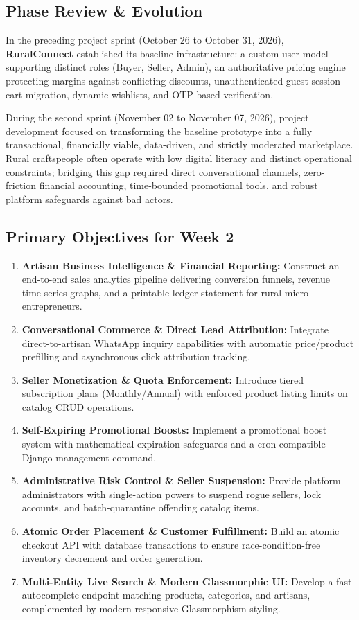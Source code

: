 \documentclass[12pt,a4paper]{article}
\begin{document}
\subsection{Phase Review \& Evolution}
In the preceding project sprint (October 26 to October 31, 2026), \textbf{RuralConnect} established its baseline infrastructure: a custom user model supporting distinct roles (Buyer, Seller, Admin), an authoritative pricing engine protecting margins against conflicting discounts, unauthenticated guest session cart migration, dynamic wishlists, and OTP-based verification.

During the second sprint (November 02 to November 07, 2026), project development focused on transforming the baseline prototype into a fully transactional, financially viable, data-driven, and strictly moderated marketplace. Rural craftspeople often operate with low digital literacy and distinct operational constraints; bridging this gap required direct conversational channels, zero-friction financial accounting, time-bounded promotional tools, and robust platform safeguards against bad actors.

\subsection{Primary Objectives for Week 2}
\begin{enumerate}
    \item \textbf{Artisan Business Intelligence \& Financial Reporting:} Construct an end-to-end sales analytics pipeline delivering conversion funnels, revenue time-series graphs, and a printable ledger statement for rural micro-entrepreneurs.
    \item \textbf{Conversational Commerce \& Direct Lead Attribution:} Integrate direct-to-artisan WhatsApp inquiry capabilities with automatic price/product prefilling and asynchronous click attribution tracking.
    \item \textbf{Seller Monetization \& Quota Enforcement:} Introduce tiered subscription plans (Monthly/Annual) with enforced product listing limits on catalog CRUD operations.
    \item \textbf{Self-Expiring Promotional Boosts:} Implement a promotional boost system with mathematical expiration safeguards and a cron-compatible Django management command.
    \item \textbf{Administrative Risk Control \& Seller Suspension:} Provide platform administrators with single-action powers to suspend rogue sellers, lock accounts, and batch-quarantine offending catalog items.
    \item \textbf{Atomic Order Placement \& Customer Fulfillment:} Build an atomic checkout API with database transactions to ensure race-condition-free inventory decrement and order generation.
    \item \textbf{Multi-Entity Live Search \& Modern Glassmorphic UI:} Develop a fast autocomplete endpoint matching products, categories, and artisans, complemented by modern responsive Glassmorphism styling.
\end{enumerate}
\end{document}
